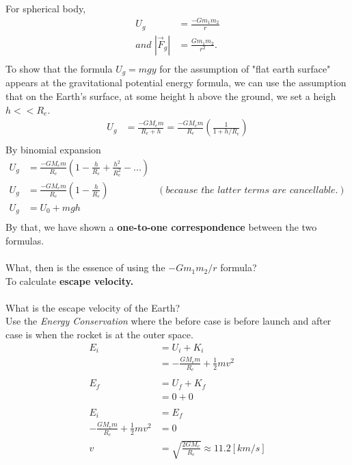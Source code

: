 \documentclass{article}
\begin{document}
\begin{enumerate}
    For spherical body, \\
    \begin{align*}
        U_g&=\frac{-Gm_1m_2}{r} \\
        \textit{and }|\vec{F}_g|&=\frac{Gm_1m_2}{r^2}. \\
    \end{align*}
    To show that the formula $U_g=mgy$ for the assumption of "flat earth surface" appears at the gravitational potential energy formula, we can use the assumption that on the Earth's surface, at some height h above the ground, we set a heigh $h<<R_e$.
    \begin{align*}
        U_g&=\frac{-GM_em}{R_e+h}=\frac{-GM_em}{R_e}(\frac{1}{1+h/R_e}) \\
    \end{align*}
    By binomial expansion
    \begin{align*}
        U_g&=\frac{-GM_em}{R_e}(1-\frac{h}{R_e}+\frac{h^2}{R_e^2}-...)\\
        U_g&=\frac{-GM_em}{R_e}({1-\frac{h}{R_e}})&(\textit{because the latter terms are cancellable.}) \\
        U_g&=U_0+mgh \\
    \end{align*}
    By that, we have shown a \textbf{one-to-one correspondence} between the two formulas. \\
    \\
    What, then is the essence of using the $-Gm_1m_2/r$ formula? \\ To calculate \textbf{escape velocity.} \\
    \\
    What is the escape velocity of the Earth? \\
    Use the \textit{Energy Conservation} where the before case is before launch and after case is when the rocket is at the outer space.
    \begin{align*}
        E_i&=U_i+K_i \\
        &=-\frac{GM_em}{R_e}+\frac{1}{2}mv^2 \\
        \\
        E_f&=U_f+K_f \\
        &=0+0 \\
        \\
        E_i&=E_f \\
        -\frac{GM_em}{R_e}+\frac{1}{2}mv^2&=0 \\
        v&=\sqrt{\frac{2GM_e}{R_e}}\approx11.2[km/s]
    \end{align*}
\end{enumerate}
\end{document}
